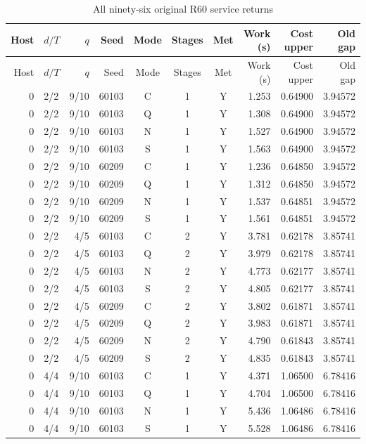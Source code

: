\begingroup\small\setlength{\tabcolsep}{3pt}
\begin{longtable}{rlrrcccrrr}
\caption{All ninety-six original R60 service returns}\label{tab:service-registry61}\\
\hline
Host & $d/T$ & $q$ & Seed & Mode & Stages & Met & Work (s) & Cost upper & Old gap \\
\hline\endfirsthead
\hline
Host & $d/T$ & $q$ & Seed & Mode & Stages & Met & Work (s) & Cost upper & Old gap \\
\hline\endhead
0 & 2/2 & 9/10 & 60103 & C & 1 & Y & 1.253 & 0.64900 & 3.94572 \\
0 & 2/2 & 9/10 & 60103 & Q & 1 & Y & 1.308 & 0.64900 & 3.94572 \\
0 & 2/2 & 9/10 & 60103 & N & 1 & Y & 1.527 & 0.64900 & 3.94572 \\
0 & 2/2 & 9/10 & 60103 & S & 1 & Y & 1.563 & 0.64900 & 3.94572 \\
0 & 2/2 & 9/10 & 60209 & C & 1 & Y & 1.236 & 0.64850 & 3.94572 \\
0 & 2/2 & 9/10 & 60209 & Q & 1 & Y & 1.312 & 0.64850 & 3.94572 \\
0 & 2/2 & 9/10 & 60209 & N & 1 & Y & 1.537 & 0.64851 & 3.94572 \\
0 & 2/2 & 9/10 & 60209 & S & 1 & Y & 1.561 & 0.64851 & 3.94572 \\
0 & 2/2 & 4/5 & 60103 & C & 2 & Y & 3.781 & 0.62178 & 3.85741 \\
0 & 2/2 & 4/5 & 60103 & Q & 2 & Y & 3.979 & 0.62178 & 3.85741 \\
0 & 2/2 & 4/5 & 60103 & N & 2 & Y & 4.773 & 0.62177 & 3.85741 \\
0 & 2/2 & 4/5 & 60103 & S & 2 & Y & 4.805 & 0.62177 & 3.85741 \\
0 & 2/2 & 4/5 & 60209 & C & 2 & Y & 3.802 & 0.61871 & 3.85741 \\
0 & 2/2 & 4/5 & 60209 & Q & 2 & Y & 3.983 & 0.61871 & 3.85741 \\
0 & 2/2 & 4/5 & 60209 & N & 2 & Y & 4.790 & 0.61843 & 3.85741 \\
0 & 2/2 & 4/5 & 60209 & S & 2 & Y & 4.835 & 0.61843 & 3.85741 \\
0 & 4/4 & 9/10 & 60103 & C & 1 & Y & 4.371 & 1.06500 & 6.78416 \\
0 & 4/4 & 9/10 & 60103 & Q & 1 & Y & 4.704 & 1.06500 & 6.78416 \\
0 & 4/4 & 9/10 & 60103 & N & 1 & Y & 5.436 & 1.06486 & 6.78416 \\
0 & 4/4 & 9/10 & 60103 & S & 1 & Y & 5.528 & 1.06486 & 6.78416 \\

\end{longtable}
